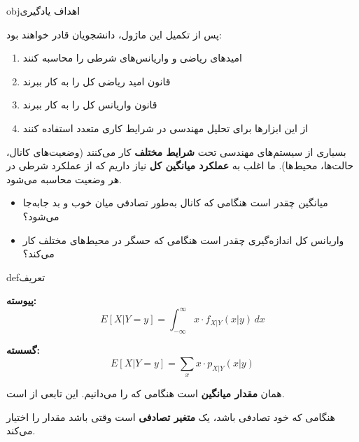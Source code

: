\begin{PSbox}[unbreakable]{obj}{اهداف یادگیری}

پس از تکمیل این ماژول، دانشجویان قادر خواهند بود:

\begin{enumerate}
\def\labelenumi{\arabic{enumi}.}
\tightlist
\item
  امیدهای ریاضی و واریانس‌های شرطی را محاسبه کنند
\item
  قانون امید ریاضی کل را به کار ببرند
\item
  قانون واریانس کل را به کار ببرند
\item
  از این ابزارها برای تحلیل مهندسی در شرایط کاری متعدد استفاده کنند
\end{enumerate}

\end{PSbox}


بسیاری از سیستم‌های مهندسی تحت \textbf{شرایط مختلف} کار می‌کنند (وضعیت‌های کانال، حالت‌ها، محیط‌ها). ما اغلب به \textbf{عملکرد میانگین کل} نیاز داریم که از عملکرد شرطی در هر وضعیت محاسبه می‌شود.

\begin{itemize}
\tightlist
\item
  میانگین  چقدر است هنگامی که کانال به‌طور تصادفی میان خوب و بد جابه‌جا می‌شود؟
\item
  واریانس کل اندازه‌گیری چقدر است هنگامی که حسگر در محیط‌های مختلف کار می‌کند؟
\end{itemize}


\begin{PSbox}[unbreakable]{def}{تعریف}

\textbf{پیوسته:}\PSbr{}\[E[X|Y=y] = \int_{-\infty}^{\infty} x \cdot f_{X|Y}(x|y) \, dx\]

\textbf{گسسته:}\PSbr{}\[E[X|Y=y] = \sum_x x \cdot p_{X|Y}(x|y)\]

\end{PSbox}


 همان \textbf{مقدار میانگین } است هنگامی که  را می‌دانیم. این تابعی از  است.


هنگامی که خود  تصادفی باشد،  یک \textbf{متغیر تصادفی} است  وقتی  باشد مقدار  را اختیار می‌کند.

